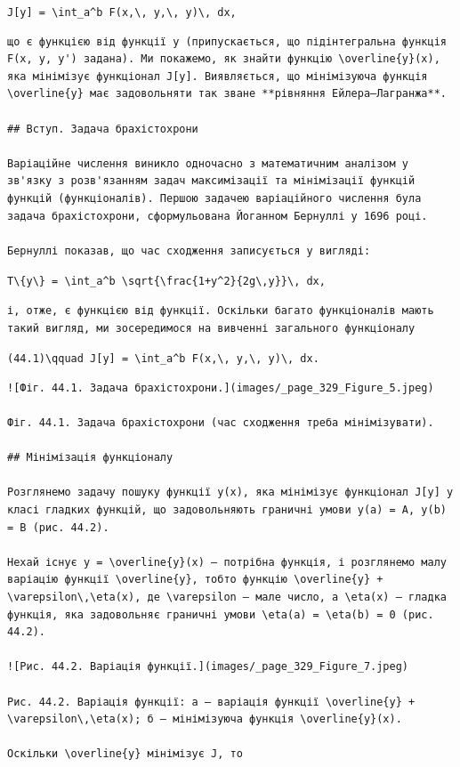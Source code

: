 \documentclass[
  ukrainian,
]{article}
\begin{document}
\texttt{J{[}y{]}\ =\ \textbackslash{}int\_a\^{}b\ F(x,\textbackslash{},\ y,\textbackslash{},\ y\textquotesingle{})\textbackslash{},\ dx,}

\begin{verbatim}
що є функцією від функції y (припускається, що підінтегральна функція F(x, y, y') задана). Ми покажемо, як знайти функцію \overline{y}(x), яка мінімізує функціонал J[y]. Виявляється, що мінімізуюча функція \overline{y} має задовольняти так зване **рівняння Ейлера–Лагранжа**.

## Вступ. Задача брахістохрони

Варіаційне числення виникло одночасно з математичним аналізом у зв'язку з розв'язанням задач максимізації та мінімізації функцій функцій (функціоналів). Першою задачею варіаційного числення була задача брахістохрони, сформульована Йоганном Бернуллі у 1696 році.

Бернуллі показав, що час сходження записується у вигляді:
\end{verbatim}

\texttt{T\textbackslash{}\{y\textbackslash{}\}\ =\ \textbackslash{}int\_a\^{}b\ \textbackslash{}sqrt\{\textbackslash{}frac\{1+y\textquotesingle{}\^{}2\}\{2g\textbackslash{},y\}\}\textbackslash{},\ dx,}

\begin{verbatim}
і, отже, є функцією від функції. Оскільки багато функціоналів мають такий вигляд, ми зосередимося на вивченні загального функціоналу
\end{verbatim}

\texttt{(44.1)\textbackslash{}qquad\ J{[}y{]}\ =\ \textbackslash{}int\_a\^{}b\ F(x,\textbackslash{},\ y,\textbackslash{},\ y\textquotesingle{})\textbackslash{},\ dx.}

\begin{verbatim}
![Фіг. 44.1. Задача брахістохрони.](images/_page_329_Figure_5.jpeg)

Фіг. 44.1. Задача брахістохрони (час сходження треба мінімізувати).

## Мінімізація функціоналу

Розглянемо задачу пошуку функції y(x), яка мінімізує функціонал J[y] у класі гладких функцій, що задовольняють граничні умови y(a) = A, y(b) = B (рис. 44.2).

Нехай існує y = \overline{y}(x) — потрібна функція, і розглянемо малу варіацію функції \overline{y}, тобто функцію \overline{y} + \varepsilon\,\eta(x), де \varepsilon — мале число, а \eta(x) — гладка функція, яка задовольняє граничні умови \eta(a) = \eta(b) = 0 (рис. 44.2).

![Рис. 44.2. Варіація функції.](images/_page_329_Figure_7.jpeg)

Рис. 44.2. Варіація функції: а — варіація функції \overline{y} + \varepsilon\,\eta(x); б — мінімізуюча функція \overline{y}(x).

Оскільки \overline{y} мінімізує J, то
\end{verbatim}
\end{document}
